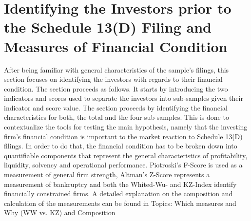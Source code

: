 \documentclass[12pt]{article}
\begin{document}
\section{Identifying the Investors prior to the Schedule 13(D) Filing and Measures of Financial Condition}

After being familiar with general characteristics of the sample's filings, this section focuses on identifying the investors with regards to their financial condition. The section proceeds as follows. It starts by introducing the two indicators and scores used to separate the investors into sub-samples given their indicator and score value. The section proceeds by identifying the financial characteristics for both, the total and the four sub-samples. This is done to contextualize the tools for testing the main hypothesis, namely that the investing firm's financial condition is important to the market reaction to Schedule 13(D) filings. 
In order to do that, the financial condition has to be broken down into quantifiable components that represent the general characteristics of profitability, liquidity, solvency and operational performance. Piotroski's F-Score is used as a measurement of general firm strength, Altman's Z-Score represents a measurement of bankruptcy and both the Whited-Wu- and KZ-Index identify financially constrained firms. A detailed explanation on the composition and calculation of the measurements can be found in 
Topics: Which measures and Why (WW vs. KZ) and Composition
\end{document}
